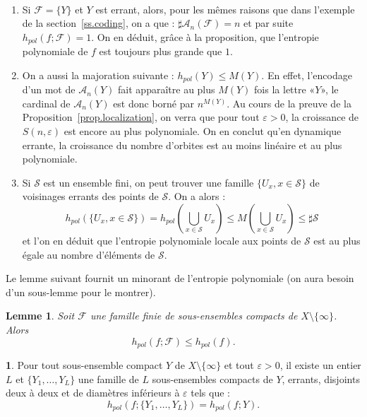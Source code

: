 \documentclass[11pt]{article}
\newtheorem{lemm}[theo]{Lemme}
\newtheorem*{remas*}{Remarques}
\providecommand{\og}{«\nobreakspace}
\providecommand{\fg}{\nobreakspace»}
\theoremstyle{definition}
\newcommand{\enoncename}{}
\newtheorem{corpusenonce}[theo]{\enoncename}
\newenvironment{enonce}[2][]{\renewcommand{\enoncename}{#2}\begin{corpusenonce}}{\end{corpusenonce}}
\newcommand{\pointir}{.\ ---\ }
\numberwithin{equation}{section}
\numberwithin{figure}{section}
\numberwithin{table}{section}
\newcommand*\cA{{\mathcal A}}
\newcommand*\cF{{\mathcal F}}
\newcommand*\cS{{\mathcal S}}
\newenvironment{remasc*}{\let\pointir\relax \begin{remas*}}{\end{remas*}}
\begin{document}
\begin{remasc*}\ 
\begin{enumerate}
\item Si $\cF=\{Y\}$ et $Y$ est errant, alors, pour les mêmes raisons que dans l'exemple de la section~\ref{ss.coding}, on a que : $\sharp \cA_n(\cF)= n$ et par suite $h_{pol}(f; \cF)=1$. On en déduit, grâce à la proposition, que l'entropie polynomiale de $f$ est toujours plus grande que $1$.
\item On a aussi la majoration suivante : $h_{pol}(Y)\leq M(Y)$. En effet, l'encodage d'un mot de $\cA_n(Y)$ fait apparaître au plus $M(Y)$ fois la lettre \og$Y$\fg, le cardinal de $\cA_n(Y)$ est donc borné par $n^{M(Y)}$. Au cours de la preuve de la Proposition~\ref{prop.localization}, on verra que pour tout $\varepsilon>0$, la croissance de $S(n,\varepsilon)$ est encore au plus polynomiale. On en conclut qu'en dynamique errante, la croissance du nombre d'orbites est au moins linéaire et au plus polynomiale.
\item Si $\cS$ est un ensemble fini, on peut trouver une famille $\{U_x, x \in \cS\}$ de voisinages errants des points de $\cS$. On a alors :
\[
h_{pol}(\{U_x, x \in \cS\})=h_{pol}\left(\bigcup_{x \in \cS} U_x\right) \leq M\left(\bigcup_{x \in \cS} U_x\right) \leq \sharp \cS
\]
et l'on en déduit que l'entropie polynomiale locale {aux points} de $\cS$ est {au plus égale} au nombre d'éléments de $\cS$.
\end{enumerate}
\end{remasc*}


Le lemme suivant fournit un minorant de l'entropie polynomiale (on aura besoin d'un sous-lemme pour le montrer).

\begin{lemm}\label{lem.inequality}
Soit $\cF$ une famille finie de sous-ensembles compacts de $X \setminus\{\infty\}$. Alors
\[
h_{pol}(f;\cF) \leq h_{pol}(f).
\]
\end{lemm}

\begin{enonce}{Sous-Lemme}\label{sublemma.cut1}
Pour tout sous-ensemble compact $Y$ de $X \setminus \{\infty\}$ et tout $\varepsilon>0$, il existe un entier $L$ et $\{Y_1, \dots,Y_L\}$ une famille de $L$ sous-ensembles compacts de $Y$, {errants}, disjoints deux à deux et de diamètres inférieurs à $\varepsilon$ tels que :
\[
h_{pol}(f;\{ Y_1, \dots,Y_L \}) = h_{pol}(f;Y).
\]
\end{enonce}
\end{document}
